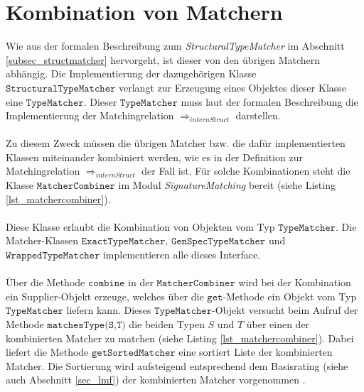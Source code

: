 \chapter{Kombination von Matchern}\label{app_matchercombination}
Wie aus der formalen Beschreibung zum \emph{StructuralTypeMatcher} im Abschnitt \ref{subsec_structmatcher} hervorgeht, ist dieser von den übrigen Matchern abhängig. Die Implementierung der dazugehörigen Klasse $\texttt{StructuralTypeMatcher}$ verlangt zur Erzeugung eines Objektes dieser Klasse eine $\texttt{TypeMatcher}$. Dieser $\texttt{TypeMatcher}$ muss laut der formalen Beschreibung die Implementierung der Matchingrelation $\Rightarrow_{internStruct}$ darstellen.
\\\\
Zu diesem Zweck müssen die übrigen Matcher bzw. die dafür implementierten Klassen miteinander kombiniert werden, wie es in der Definition zur Matchingrelation $\Rightarrow_{internStruct}$ der Fall ist. Für solche Kombinationen steht die Klasse $\texttt{MatcherCombiner}$ im \Gls{Modul} \emph{SignatureMatching} bereit (siehe Listing \ref{lst_matchercombiner}).
\\\\
Diese Klasse erlaubt die Kombination von Objekten vom Typ $\texttt{TypeMatcher}$. 
Die Matcher-Klassen $\texttt{ExactTypeMatcher}$, $\texttt{GenSpecTypeMatcher}$ und $\texttt{WrappedTypeMatcher}$ implementieren alle dieses \Gls{Interface}. 
\\\\
Über die Methode $\texttt{combine}$ in der $\texttt{MatcherCombiner}$ wird bei der Kombination ein Supplier-Objekt erzeuge, welches über die $\texttt{get}$-Methode ein Objekt vom Typ $\texttt{TypeMatcher}$ liefern kann. Dieses $\texttt{TypeMatcher}$-Objekt versucht beim Aufruf der Methode $\texttt{matchesType(S,T)}$ die beiden Typen $S$ und $T$ über einen der kombinierten Matcher zu matchen (siehe  Listing \ref{lst_matchercombiner}). Dabei liefert die Methode $\texttt{getSortedMatcher}$ eine sortiert Liste der kombinierten Matcher. Die Sortierung wird aufsteigend entsprechend dem Basisrating (siehe auch Abschnitt \ref{sec_lmf}) der kombinierten Matcher vorgenommen .
